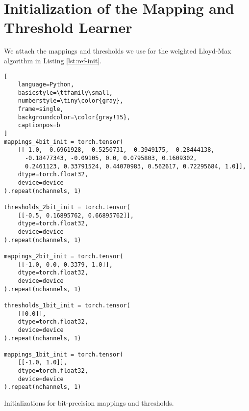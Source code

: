 \section{Initialization of the Mapping and Threshold Learner} \label{app:lloydinit}

We attach the mappings and thresholds we use for the weighted Lloyd-Max algorithm in Listing \ref{lst:ref-init}.

\begin{listing}[ht]
\begin{lstlisting}[
    language=Python,
    basicstyle=\ttfamily\small,
    numberstyle=\tiny\color{gray},
    frame=single,
    backgroundcolor=\color{gray!15},
    captionpos=b
]
mappings_4bit_init = torch.tensor(
    [[-1.0, -0.6961928, -0.5250731, -0.3949175, -0.28444138,
      -0.18477343, -0.09105, 0.0, 0.0795803, 0.1609302,
      0.2461123, 0.33791524, 0.44070983, 0.562617, 0.72295684, 1.0]],
    dtype=torch.float32, 
    device=device
).repeat(nchannels, 1)

thresholds_2bit_init = torch.tensor(
    [[-0.5, 0.16895762, 0.66895762]],
    dtype=torch.float32, 
    device=device
).repeat(nchannels, 1)

mappings_2bit_init = torch.tensor(
    [[-1.0, 0.0, 0.3379, 1.0]],
    dtype=torch.float32, 
    device=device
).repeat(nchannels, 1)

thresholds_1bit_init = torch.tensor(
    [[0.0]],
    dtype=torch.float32, 
    device=device
).repeat(nchannels, 1)

mappings_1bit_init = torch.tensor(
    [[-1.0, 1.0]],
    dtype=torch.float32, 
    device=device
).repeat(nchannels, 1)
\end{lstlisting}
\caption{Initializations for bit-precision mappings and thresholds.}
\label{lst:ref-init}
\end{listing}

\newpage
